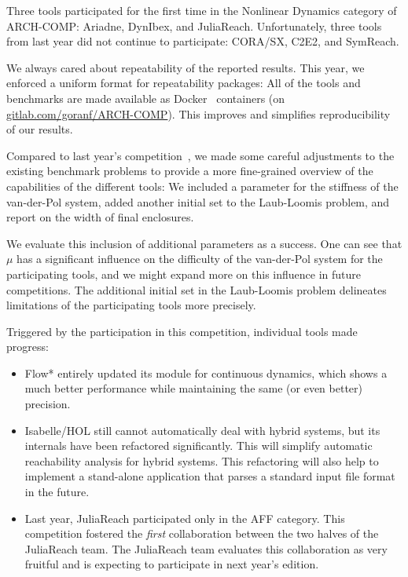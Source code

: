 \documentclass[EPiC]{easychair}
\begin{document}
Three tools participated for the first time in the Nonlinear Dynamics category of ARCH-COMP: Ariadne, DynIbex, and JuliaReach. Unfortunately, three tools from last year did not continue to participate: CORA/SX, C2E2, and SymReach.

We always cared about repeatability of the reported results.
This year, we enforced a uniform format for repeatability packages:
All of the tools and benchmarks are made available as Docker~\cite{boettiger2015introduction} containers (on \href{https://gitlab.com/goranf/ARCH-COMP}{gitlab.com/goranf/ARCH-COMP}).
This improves and simplifies reproducibility of our results.

Compared to last year's competition~\cite{ARCH_COMP18}, we made some careful adjustments to the existing benchmark problems to provide a more fine-grained overview of the capabilities of the different tools:
We included a parameter for the stiffness of the van-der-Pol system, added another initial set to the Laub-Loomis problem, and report on the width of final enclosures.

We evaluate this inclusion of additional parameters as a success.
One can see that $\mu$ has a significant influence on the difficulty of the van-der-Pol system for the participating tools, and we might expand more on this influence in future competitions. The additional initial set in the Laub-Loomis problem delineates limitations of the participating tools more precisely.

Triggered by the participation in this competition, individual tools made progress:
\begin{itemize}
\item Flow* entirely updated its module for continuous dynamics, which  shows a much better performance while maintaining the same (or even better) precision.
\item Isabelle/HOL still cannot automatically deal with hybrid systems, but its internals have been refactored significantly. This will simplify automatic reachability analysis for hybrid systems. This refactoring will also help to implement a stand-alone application that parses a standard input file format in the future.
\item Last year, JuliaReach participated only in the AFF category. This competition fostered the \emph{first} collaboration between the two halves of the JuliaReach team. The JuliaReach team evaluates this collaboration as very fruitful and is expecting to participate in next year's edition.

\end{itemize}
\end{document}
